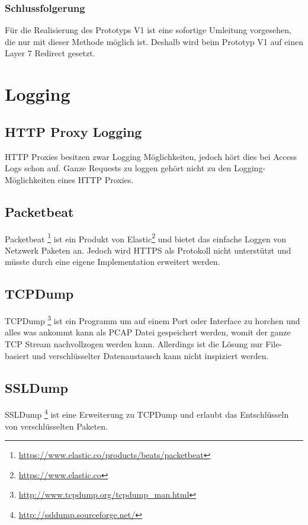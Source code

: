 \subsubsection{Schlussfolgerung}
Für die Realisierung des Prototyps V1 ist eine sofortige Umleitung vorgesehen, die nur mit dieser Methode möglich ist. Deshalb wird beim Prototyp V1 auf einen Layer 7 Redirect gesetzt.



\section{Logging}
\label{analyse:logging}
\subsection{HTTP Proxy Logging}
HTTP Proxies\cite{squid:log} besitzen zwar Logging Möglichkeiten, jedoch hört dies bei Access Logs schon auf. Ganze Requests zu loggen gehört nicht zu den Logging-Möglichkeiten eines HTTP Proxies.

\subsection{Packetbeat}
Packetbeat\cite{elastic:packetbeat} \footnote{\url{https://www.elastic.co/products/beats/packetbeat}} ist ein Produkt von Elastic\footnote{\url{https://www.elastic.co}} und bietet das einfache Loggen von Netzwerk Paketen an.
Jedoch wird HTTPS als Protokoll nicht unterstützt und müsste durch eine eigene Implementation erweitert werden.


\subsection{TCPDump}
TCPDump\cite{tcpdump} \footnote{\url{http://www.tcpdump.org/tcpdump_man.html}} ist ein Programm um auf einem Port oder Interface zu horchen und alles was ankommt kann als PCAP Datei gespeichert werden, womit der ganze TCP Stream nachvollzogen werden kann. Allerdings ist die Lösung nur File-basiert und verschlüsselter Datenaustausch kann nicht inspiziert werden. 

\subsection{SSLDump}
SSLDump\cite{ssldump} \footnote{\url{http://ssldump.sourceforge.net/}} ist eine Erweiterung zu TCPDump und erlaubt das Entschlüsseln von verschlüsselten Paketen.


